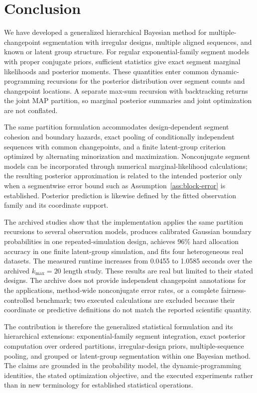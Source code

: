 \section{Conclusion}
\label{sec:conclusion}

We have developed a generalized hierarchical Bayesian method for multiple-changepoint segmentation with irregular designs, multiple aligned sequences, and known or latent group structure. For regular exponential-family segment models with proper conjugate priors, sufficient statistics give exact segment marginal likelihoods and posterior moments. These quantities enter common dynamic-programming recursions for the posterior distribution over segment counts and changepoint locations. A separate max-sum recursion with backtracking returns the joint MAP partition, so marginal posterior summaries and joint optimization are not conflated.

The same partition formulation accommodates design-dependent segment cohesion and boundary hazards, exact pooling of conditionally independent sequences with common changepoints, and a finite latent-group criterion optimized by alternating minorization and maximization. Nonconjugate segment models can be incorporated through numerical marginal-likelihood calculations; the resulting posterior approximation is related to the intended posterior only when a segmentwise error bound such as Assumption~\ref{ass:block-error} is established. Posterior prediction is likewise defined by the fitted observation family and its coordinate support.

The archived studies show that the implementation applies the same partition recursions to several observation models, produces calibrated Gaussian boundary probabilities in one repeated-simulation design, achieves 96\% hard allocation accuracy in one finite latent-group simulation, and fits four heterogeneous real datasets. The measured runtime increases from 0.0455 to 1.0585 seconds over the archived $k_{\max}=20$ length study. These results are real but limited to their stated designs. The archive does not provide independent changepoint annotations for the applications, method-wide nonconjugate error rates, or a complete fairness-controlled benchmark; two executed calculations are excluded because their coordinate or predictive definitions do not match the reported scientific quantity.

The contribution is therefore the generalized statistical formulation and its hierarchical extensions: exponential-family segment integration, exact posterior computation over ordered partitions, irregular-design priors, multiple-sequence pooling, and grouped or latent-group segmentation within one Bayesian method. The claims are grounded in the probability model, the dynamic-programming identities, the stated optimization objective, and the executed experiments rather than in new terminology for established statistical operations.
